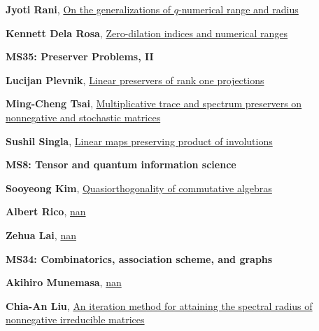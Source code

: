 \documentclass[ILAS2025-program.tex]{subfiles}
\begin{document}
\begin{description}
\begin{description}
        \item[] \hypertarget{up0278}{}\textbf{Jyoti Rani}, \hyperlink{down0278}{On the generalizations of $q$-numerical range and radius}
        \item[] \hypertarget{up0279}{}\textbf{Kennett Dela Rosa}, \hyperlink{down0279}{Zero-dilation indices and numerical ranges}
        \end{description}
    \begin{description}
    \item[] {\color{mstitle}\textbf{MS35: Preserver Problems, II}} 
    \item[] \hypertarget{up0280}{}\textbf{Lucijan Plevnik}, \hyperlink{down0280}{Linear preservers of rank one projections}
        \item[] \hypertarget{up0281}{}\textbf{Ming-Cheng Tsai}, \hyperlink{down0281}{Multiplicative trace and spectrum preservers  on   nonnegative and stochastic matrices
}
        \item[] \hypertarget{up0282}{}\textbf{Sushil Singla}, \hyperlink{down0282}{Linear maps preserving product of involutions}
        \end{description}
    \begin{description}
    \item[] {\color{mstitle}\textbf{MS8: Tensor and quantum information science}} 
    \item[] \hypertarget{up0283}{}\textbf{Sooyeong Kim}, \hyperlink{down0283}{Quasiorthogonality of commutative algebras
}
        \item[] \hypertarget{up0284}{}\textbf{Albert Rico}, \hyperlink{down0284}{nan}
        \item[] \hypertarget{up0285}{}\textbf{Zehua Lai}, \hyperlink{down0285}{nan}
        \end{description}
    \begin{description}
    \item[] {\color{mstitle}\textbf{MS34: Combinatorics, association scheme, and graphs}} 
    \item[] \hypertarget{up0286}{}\textbf{Akihiro Munemasa}, \hyperlink{down0286}{nan}
        \item[] \hypertarget{up0287}{}\textbf{Chia-An Liu}, \hyperlink{down0287}{An iteration method for attaining the spectral radius of nonnegative irreducible matrices
}
\end{description}
\end{description}
\end{document}
